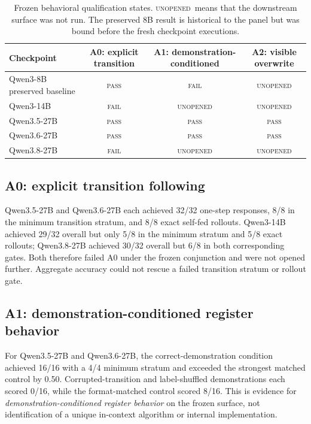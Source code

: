 \documentclass[10pt,a4paper]{article}
\newcommand{\PASS}{\textsc{pass}}
\newcommand{\FAIL}{\textsc{fail}}
\newcommand{\UNOPENED}{\textsc{unopened}}
\begin{document}
\begin{table}[ht]
\centering
\small
\caption{Frozen behavioral qualification states. \UNOPENED\ means that the downstream surface was not run. The preserved 8B result is historical to the panel but was bound before the fresh checkpoint executions.}
\label{tab:checkpoint-matrix}
\begin{tabular}{@{}lccc@{}}
\toprule
Checkpoint & A0: explicit transition & A1: demonstration-conditioned & A2: visible overwrite \\
\midrule
Qwen3-8B preserved baseline & \PASS & \FAIL & \UNOPENED \\
Qwen3-14B & \FAIL & \UNOPENED & \UNOPENED \\
Qwen3.5-27B & \PASS & \PASS & \PASS \\
Qwen3.6-27B & \PASS & \PASS & \PASS \\
Qwen3.8-27B & \FAIL & \UNOPENED & \UNOPENED \\
\bottomrule
\end{tabular}
\end{table}

\subsection{A0: explicit transition following}

Qwen3.5-27B and Qwen3.6-27B each achieved 32/32 one-step responses, 8/8 in the minimum transition stratum, and 8/8 exact self-fed rollouts. Qwen3-14B achieved 29/32 overall but only 5/8 in the minimum stratum and 5/8 exact rollouts; Qwen3.8-27B achieved 30/32 overall but 6/8 in both corresponding gates. Both therefore failed A0 under the frozen conjunction and were not opened further. Aggregate accuracy could not rescue a failed transition stratum or rollout gate.

\subsection{A1: demonstration-conditioned register behavior}

For Qwen3.5-27B and Qwen3.6-27B, the correct-demonstration condition achieved 16/16 with a 4/4 minimum stratum and exceeded the strongest matched control by 0.50. Corrupted-transition and label-shuffled demonstrations each scored 0/16, while the format-matched control scored 8/16. This is evidence for \emph{demonstration-conditioned register behavior} on the frozen surface, not identification of a unique in-context algorithm or internal implementation.
\end{document}
